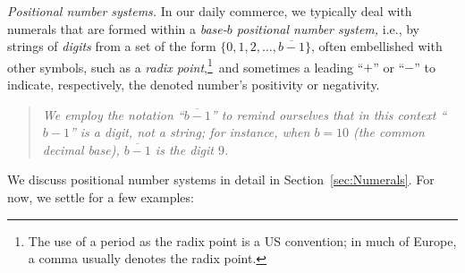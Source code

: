 \noindent
{\it Positional number systems.}
%
In our daily commerce, we typically deal with numerals that are formed
within a {\it base-$b$ positional number system,}
%
i.e., by strings of {\it digits} from a set of the form $\{0, 1, 2,
\ldots, \overline{b-1}\}$, often embellished with other symbols, such as
a {\em radix point},\footnote{The use of a period as the radix point
  is a US convention; in much of Europe, a comma usually denotes the
  radix point.}~and sometimes a leading ``$+$'' or ``$-$'' to
indicate, respectively, the denoted number's positivity or negativity.
\begin{quote}
{\em We employ the notation ``$\overline{b-1}$'' to remind ourselves
  that in this context ``$b-1$'' is a digit, not a string; for
  instance, when $b = 10$ (the common {\em decimal} base),
  $\overline{b-1}$ is the digit $9$.  }
\end{quote}
We discuss positional number systems in detail in
Section~\ref{sec:Numerals}.  For now, we settle for a few examples:
